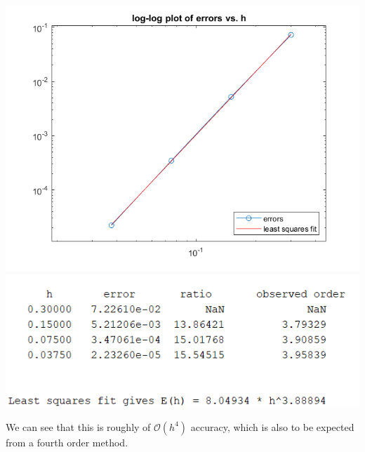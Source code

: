 \documentclass{article}
\begin{document}
\begin{center}
    \includegraphics[scale = 0.4]{bvp4Mod_err.png}
    \includegraphics[scale = 0.7]{bvp4Mod_errTab.PNG}
\end{center}

We can see that this is roughly of $\mathcal{O}(h^4)$ accuracy, which is also to be expected from a fourth order method.
\end{document}
